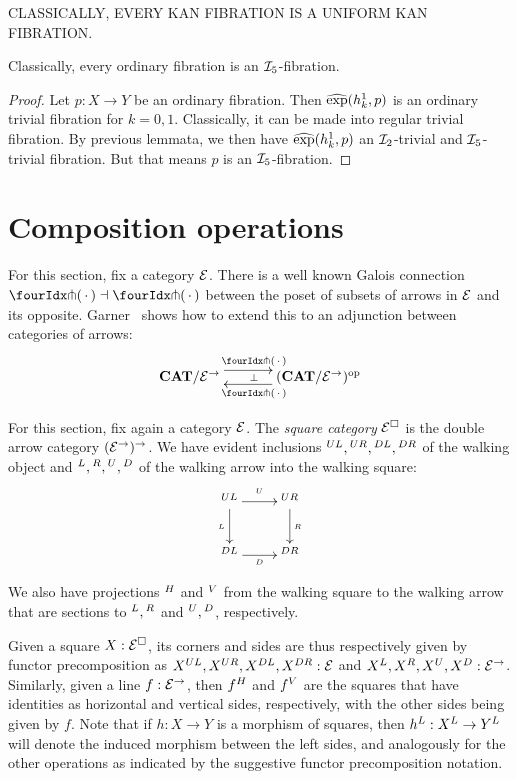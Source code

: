 \documentclass[reqno,10pt,a4paper,oneside]{amsart}
\begin{document}
CLASSICALLY, EVERY KAN FIBRATION IS A UNIFORM KAN FIBRATION.

\begin{lemma}
Classically, every ordinary fibration is an $\cal{I}_5$-fibration.
\end{lemma}

\begin{proof}
Let $p : X \to Y$ be an ordinary fibration.
Then $\hatexp(h_k^1, p)$ is an ordinary trivial fibration for $k = 0, 1$.
Classically, it can be made into regular trivial fibration.
By previous lemmata, we then have $\hatexp(h_k^1, p)$ an $\cal{I}_2$-trivial and $\cal{I}_5$-trivial fibration.
But that means $p$ is an $\cal{I}_5$-fibration.
\end{proof}



\section{Composition operations} 

For this section, fix a category $\catE$.
There is a well known Galois connection $\liftr{\brarghole} \dashv \liftl{\brarghole}$ between the poset of subsets of arrows in $\catE$ and its opposite.
Garner~\cite{garner:small-object-argument} shows how to extend this to an adjunction between categories of arrows:
\begin{equation}
\label{garner-adjunction}
\begin{gathered}
\xymatrix@C+1em{
  \CAT/\catE^{\to}
  \ar@<5pt>[r]^{\liftl{\brarghole}}
  \ar@{}[r]|{\bot}
&
  (\CAT/\catE^{\to})^{\op}
  \ar@<5pt>[l]^{\liftr{\brarghole}}
}
\end{gathered}
\end{equation}


For this section, fix again a category $\catE$.
The \emph{square category} $\catE^{\Box}$ is the double arrow category $(\catE^{\to})^{\to}$.
We have evident inclusions $\squl, \squr, \sqdl, \sqdr$ of the walking object and $\sql, \sqr, \squ, \sqd$ of the walking arrow into the walking square:
\[
\xymatrix{
  \squl
  \ar[r]^{\squ}
  \ar[d]_{\sql}
  \ar@{}[dr]
&
  \squr
  \ar[d]^{\sqr}
\\
  \sqdl
  \ar[r]_{\sqd}
&
  \sqdr
}
\]
We also have projections $\sqhori$ and $\sqvert$ from the walking square to the walking arrow that are sections to $\sql, \sqr$ and $\squ, \sqd$, respectively.

Given a square $X : \catE^{\Box}$, its corners and sides are thus respectively given by functor precomposition as $X\squl, X\squr, X\sqdl, X\sqdr : \catE$ and $X\sql, X\sqr, X\squ, X\sqd : \catE^{\to}$.
Similarly, given a line $f : \catE^{\to}$, then $f\sqhori$ and $f\sqvert$ are the squares that have identities as horizontal and vertical sides, respectively, with the other sides being given by $f$.
Note that if $h : X \to Y$ is a morphism of squares, then \eg $h\sql : X\sql \to Y\sql$ will denote the induced morphism between the left sides, and analogously for the other operations as indicated by the suggestive functor precomposition notation.
\end{document}
